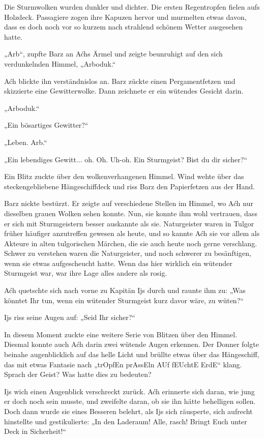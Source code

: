 Die Sturmwolken wurden dunkler und dichter. Die ersten Regentropfen fielen aufs Holzdeck. Passagiere zogen ihre Kapuzen hervor und murmelten etwas davon, dass es doch noch vor so kurzem nach strahlend schönem Wetter ausgesehen hatte.

„Arb“, zupfte Barz an Aćhs Ärmel und zeigte beunruhigt auf den sich verdunkelnden Himmel, „Arboduk.“

Aćh blickte ihn verständnislos an. Barz zückte einen Pergamentfetzen und skizzierte eine Gewitterwolke. Dann zeichnete er ein wütendes Gesicht darin.

„Arboduk.“

„Ein bösartiges Gewitter?“

„Leben. Arb.“

„Ein lebendiges Gewitt... oh. Oh. Uh-oh. Ein Sturmgeist? Bist du dir sicher?“

Ein Blitz zuckte über den wolkenverhangenen Himmel. Wind wehte über das steckengebliebene Hängeschiffdeck und riss Barz den Papierfetzen aus der Hand.

Barz nickte bestürzt. Er zeigte auf verschiedene Stellen im Himmel, wo Aćh nur dieselben grauen Wolken sehen konnte. Nun, sie konnte ihm wohl vertrauen, dass er sich mit Sturmgeistern besser auskannte als sie. Naturgeister waren in Tulgor früher häufiger anzutreffen gewesen als heute, und so kannte Aćh sie vor allem als Akteure in alten tulgorischen Märchen, die sie auch heute noch gerne verschlang. Schwer zu verstehen waren die Naturgeister, und noch schwerer zu besänftigen, wenn sie etwas aufgescheucht hatte. Wenn das hier wirklich ein wütender Sturmgeist war, war ihre Lage alles andere als rosig.

Aćh quetschte sich nach vorne zu Kapitän Ijs durch und raunte ihm zu: „Was könntet Ihr tun, wenn ein wütender Sturmgeist kurz davor wäre, zu wüten?“

Ijs riss seine Augen auf: „Seid Ihr sicher?“

In diesem Moment zuckte eine weitere Serie von Blitzen über den Himmel. Diesmal konnte auch Aćh darin zwei wütende Augen erkennen. Der Donner folgte beinahe augenblicklich auf das helle Licht und brüllte etwas über das Hängeschiff, das mit etwas Fantasie nach „trOpfEn prAssEln AUf fEUchtE ErdE“ klang. Sprach der Geist? Was hatte dies zu bedeuten?

Ijs wich einen Augenblick verschreckt zurück. Aćh erinnerte sich daran, wie jung er doch noch sein musste, und zweifelte daran, ob sie ihn hätte behelligen sollen. Doch dann wurde sie eines Besseren belehrt, als Ijs sich räusperte, sich aufrecht hinstellte und gestikulierte: „In den Laderaum! Alle, rasch! Bringt Euch unter Deck in Sicherheit!“


